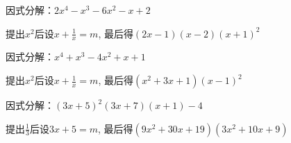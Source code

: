 \documentclass[windows,csize4,answers]{BHCexam}
\begin{document}
\begin{groups}
\begin{questions}[]
        \question[5] 因式分解：$2x^4-x^3-6x^2-x+2$
        \begin{solution}{0.5cm}
            \methodonly 提出$x^2$后设$x+\frac{1}{x}=m$, 最后得$(2x-1)(x-2)(x+1)^2$
        \end{solution}
        \vspace{3.5cm}

        \question[5] 因式分解：$x^4+x^3-4x^2+x+1$
        \begin{solution}{0.5cm}
            \methodonly 提出$x^2$后设$x+\frac{1}{x}=m$, 最后得$(x^2+3x+1)(x-1)^2$
        \end{solution}
        \vspace{3.5cm}

        \question[5] 因式分解：$(3x+5)^2(3x+7)(x+1)-4$
        \begin{solution}{0.5cm}
            \methodonly 提出$\frac{1}{3}$后设$3x+5=m$, 最后得$(9x^2+30x+19)(3x^2+10x+9)$
        \end{solution}
        \vspace{3.5cm}

    \end{questions}

\end{groups}


\label{lastpage}
\end{document}
